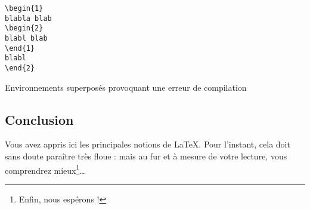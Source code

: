 \begin{listing}[ht]
\begin{verbatim}
\begin{1}
blabla blab
\begin{2}
blabl blab
\end{1}
blabl
\end{2}
\end{verbatim}
\caption{Environnements superposés provoquant une erreur de compilation}
\end{listing}
\FloatBarrier
\subsection{Conclusion}

Vous avez appris ici les principales notions de \LaTeX. Pour l'instant, cela doit sans doute paraître très floue : mais au fur et à mesure de votre lecture, vous comprendrez mieux\footnote{Enfin, nous espérons !}\ldots


